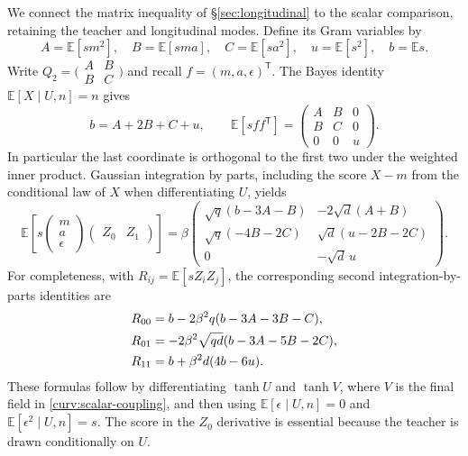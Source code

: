 \documentclass[11pt,reqno]{amsart}
\begin{document}
We connect the matrix inequality of \S\ref{sec:longitudinal} to
the scalar comparison, retaining the teacher and longitudinal modes.
Define its Gram variables by
\[
 A=\mathbb E[sm^2],\quad B=\mathbb E[sma],\quad C=\mathbb E[sa^2],
 \quad u=\mathbb E[s^2],\quad b=\mathbb E s.
\]
Write $Q_2=\bigl(\begin{smallmatrix}A&B\\B&C\end{smallmatrix}\bigr)$ and
recall $f=(m,a,\epsilon)^{\mathsf T}$. The Bayes identity
$\mathbb E[X\mid U,n]=n$ gives
\begin{equation}\label{curv:weighted-gram}
 b=A+2B+C+u,\qquad
 \mathbb E[sff^{\mathsf T}]
   =\begin{pmatrix}A&B&0\\B&C&0\\0&0&u\end{pmatrix}.
\end{equation}
In particular the last coordinate is orthogonal to the first two under
the weighted inner product. Gaussian integration by parts, including
the score $X-m$ from the conditional law of $X$ when differentiating
$U$, yields
\begin{equation}\label{curv:ibp-first}
 \mathbb E\left[s
    \begin{pmatrix}m\\a\\\epsilon\end{pmatrix}
    \begin{pmatrix}Z_0&Z_1\end{pmatrix}\right]
 =
 \beta\begin{pmatrix}
  \sqrt q(b-3A-B)&-2\sqrt d(A+B)\\
  \sqrt q(-4B-2C)&\sqrt d(u-2B-2C)\\
  0&-\sqrt d\,u
 \end{pmatrix}.
\end{equation}
For completeness, with $R_{ij}=\mathbb E[sZ_iZ_j]$, the corresponding
second integration-by-parts identities are
\begin{align}
 R_{00}&=b-2\beta^2q(b-3A-3B-C),\notag\\
 R_{01}&=-2\beta^2\sqrt{qd}(b-3A-5B-2C),\notag\\
 R_{11}&=b+\beta^2d(4b-6u).
 \label{curv:ibp-second}
\end{align}
These formulas follow by differentiating $\tanh U$ and $\tanh V$,
where $V$ is the final field in \eqref{curv:scalar-coupling}, and then
using $\mathbb E[\epsilon\mid U,n]=0$ and
$\mathbb E[\epsilon^2\mid U,n]=s$. The score in the $Z_0$ derivative
is essential because the teacher is drawn conditionally on $U$.
\end{document}
